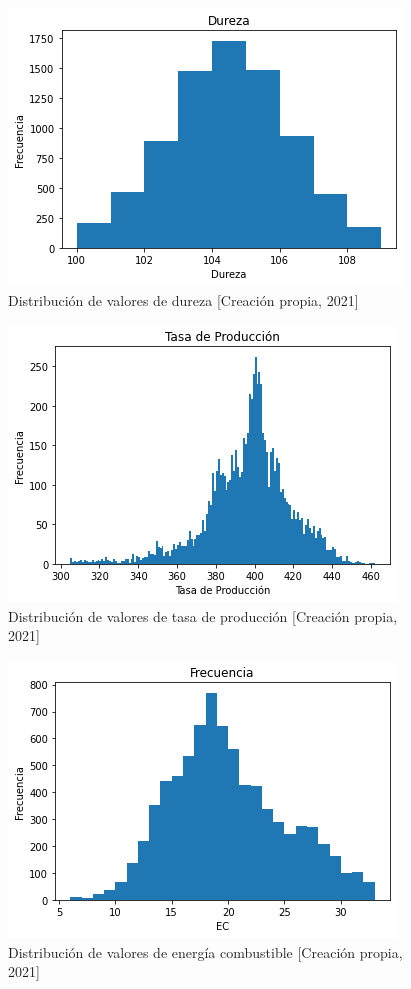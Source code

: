 \documentclass{article}
\begin{document}
\begin{figure}[H]
    \centering
    \includegraphics[scale=.7]{histogramas/img3.png}
    \caption{Distribución de valores de dureza [Creación propia, 2021]}
    \label{fig:dureza}
\end{figure}

\begin{figure}[H]
    \centering
    \includegraphics[scale=.7]{histogramas/img4.png}
    \caption{Distribución de valores de tasa de producción [Creación propia, 2021]}
    \label{fig:tasa}
\end{figure}

\begin{figure}[H]
    \centering
    \includegraphics[scale=.7]{histogramas/img5.png}
    \caption{Distribución de valores de energía combustible [Creación propia, 2021]}
    \label{fig:ee}
\end{figure}
\end{document}
